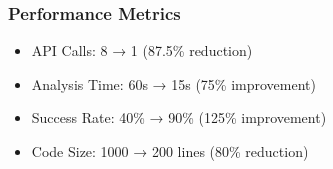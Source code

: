 \documentclass[
  letterpaper,
  DIV=11,
  numbers=noendperiod]{scrartcl}
\providecommand{\tightlist}{%
  \setlength{\itemsep}{0pt}\setlength{\parskip}{0pt}}
\begin{document}
\subsubsection{Performance Metrics}\label{performance-metrics}

\begin{itemize}
\tightlist
\item
  API Calls: 8 → 1 (87.5\% reduction)
\item
  Analysis Time: 60s → 15s (75\% improvement)\\
\item
  Success Rate: 40\% → 90\% (125\% improvement)
\item
  Code Size: 1000 → 200 lines (80\% reduction)
\end{itemize}
\end{document}
